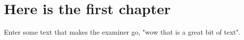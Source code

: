 \chapter{Here is the first chapter}

Enter some text that makes the examiner go, "wow that is a great bit of text".

